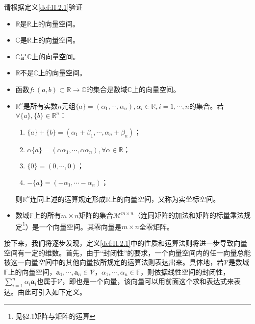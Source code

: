 \documentclass[main.tex]{subfiles}
\begin{document}
\begin{example}\label{exp:II.2.1}
请根据定义\ref{def:II.2.1}验证
\begin{itemize}
    \item $\mathbb{R}$是$\mathbb{R}$上的向量空间。
    \item $\mathbb{C}$是$\mathbb{R}$上的向量空间。
    \item $\mathbb{C}$是$\mathbb{C}$上的向量空间。
    \item $\mathbb{R}$不是$\mathbb{C}$上的向量空间。
    \item 函数$f:\left(a,b\right)\subset \mathbb{R}\rightarrow\mathbb{C}$的集合是数域$\mathbb{C}$上的向量空间。
    \item $\mathbb{R}^n$是所有实数$n$元组$\{a\}=\left(\alpha_1,\cdots,\alpha_n\right),\alpha_i\in\mathbb{R},i=1,\cdots,n$的集合。若$\forall \{a\},\{b\}\in\mathbb{R}^n$：
    \begin{enumerate}
        \item $\{a\}+\{b\}=\left(\alpha_1+\beta_1,\cdots,\alpha_n+\beta_n\right)$；
        \item $\alpha\{a\}=\left(\alpha\alpha_1,\cdots,\alpha\alpha_n\right),\forall\alpha\in\mathbb{R}$；
        \item $\{0\}=\left(0,\cdots,0\right)$；
        \item $-\{a\}=\left(-\alpha_1,\cdots-\alpha_n\right)$；
    \end{enumerate}
    则$\mathbb{R}^n$连同上述的运算规定形成$\mathbb{R}$上的向量空间，又称为实坐标空间。
    \item 数域$\mathbb{F}$上的所有$m\times n$矩阵的集合$\mathcal{M}^{m\times n}$（连同矩阵的加法和矩阵的标量乘法规定\footnote{见\cite{周胜林2012线性代数}\S 2.1矩阵与矩阵的运算}）是一个向量空间。其零向量是$m\times n$全零矩阵。
\end{itemize}
\end{example}

接下来，我们将逐步发现，定义\ref{def:II.2.1}中的性质和运算法则将进一步导致向量空间有一定的维数。首先，由于“封闭性”的要求，一个向量空间内的任一向量总能被这一向量空间中的其他向量按所规定的运算法则表达出来。具体地，若$\mathcal{V}$是数域$\mathbb{F}$上的向量空间，$\mathbf{a}_1,\cdots,\mathbf{a}_n\in\mathcal{V}$，$\alpha_1,\cdots,\alpha_n\in\mathbb{F}$，则依据线性空间的封闭性，$\sum_{i=1}^n\alpha_i\mathbf{a}_i$也属于$\mathcal{V}$，即也是一个向量，该向量可以用前面这个求和表达式来表达。由此可引入如下定义。
\end{document}

